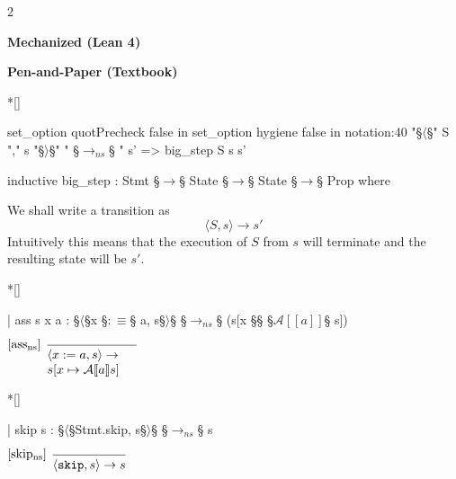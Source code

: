 \begin{paracol}{2}
\begin{leftcolumn}
    \centering \textbf{Mechanized (Lean 4)}
\end{leftcolumn}
\begin{rightcolumn}
    \centering \textbf{Pen-and-Paper (Textbook)} \\\noindent
\end{rightcolumn}
\vspace{1em}

\switchcolumn[1]*[]
\begin{leftcolumn}
    \begin{Lean_Code}
set_option quotPrecheck
  false in
set_option hygiene false in
notation:40
  "§\color{purple}\(\langle\)§" S "," s "§\color{purple}\(\rangle\)§" " §\color{purple}\(\to_{ns}\)§ " s'
  => big_step S s s'

inductive big_step : Stmt §\(\to\)§
  State §\(\to\)§ State §\(\to\)§ Prop where
    \end{Lean_Code}
\end{leftcolumn}
\begin{rightcolumn} \noindent
We shall write a transition as
\[
\langle S , s \rangle \to s'
\]
Intuitively this means that the execution of \(S\) from \(s\) will terminate and the
resulting state will be \(s'\).
\end{rightcolumn}
\vspace{2em}
\switchcolumn[1]*[]
\begin{leftcolumn}
    \begin{Lean_Code}
  | ass {s x a} :
      §\(\langle\)§x §\(: \equiv\)§ a, s§\(\rangle\)§ §\(\to_{ns}\)§
      (s[x §\mapsto§ §\(\mathcal{A}[\![a]\!]\)§ s])
\end{Lean_Code}
\end{leftcolumn}
\begin{rightcolumn}
\vspace{1.1em}
    \(
\begin{prooftree}
  \hypo{} %
  \infer[
    left label=[ass$_{\text{ns}}$]
    ]1{
        \parbox{2.5cm}{$
    \langle x := a, s \rangle \to \\
    s[x \mapsto \mathcal{A}[\![a]\!] s]
        $}
    }
\end{prooftree}
            \)
\end{rightcolumn}
\vspace{1em}
\switchcolumn[1]*[]
\begin{leftcolumn}
    \begin{Lean_Code}
  | skip {s} :
      §\(\langle\)§Stmt.skip, s§\(\rangle\)§ §\(\to_{ns}\)§ s
        \end{Lean_Code}
\end{leftcolumn}
\begin{rightcolumn}
\vspace{1.1em}
    \(
\begin{prooftree}
  \hypo{} %
  \infer[
    left label=[skip$_{\text{ns}}$]
    ]1{
        \langle \mathtt{skip}, s \rangle \to s
    }
\end{prooftree}
    \)
\end{rightcolumn}
\end{paracol}

